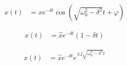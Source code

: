 \begin{boxleft}
\end{boxleft}\begin{boxrightshaded}
\begin{align*}
x(t)&=\hat{x}e^{-\delta t}\cos(\sqrt{\omega_0^2-\delta^2}t+\varphi)
\end{align*}
\end{boxrightshaded}

\begin{boxleft}
\end{boxleft}\begin{boxrightshaded}
\begin{align*}
x(t)&=\hat{x}e^{-\delta t}(1-\delta t)
\end{align*}
\end{boxrightshaded}

\begin{boxleft}
\end{boxleft}\begin{boxrightshaded}
\begin{align*}
x(t)&=\hat{x}e^{-\delta t}e^{\pm j\sqrt{\omega_0^2-\delta^2}t}
\end{align*}
\end{boxrightshaded}